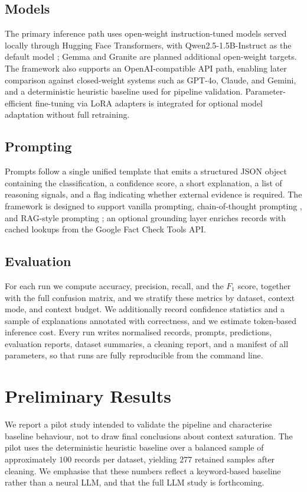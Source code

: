 \documentclass[11pt]{article}
\begin{document}
\subsection{Models}
The primary inference path uses open-weight instruction-tuned models served locally through Hugging Face Transformers, with Qwen2.5-1.5B-Instruct as the default model \citep{qwen2025report}; Gemma and Granite are planned additional open-weight targets. The framework also supports an OpenAI-compatible API path, enabling later comparison against closed-weight systems such as GPT-4o, Claude, and Gemini, and a deterministic heuristic baseline used for pipeline validation. Parameter-efficient fine-tuning via LoRA adapters \citep{hu2022lora} is integrated for optional model adaptation without full retraining.

\subsection{Prompting}
Prompts follow a single unified template that emits a structured JSON object containing the classification, a confidence score, a short explanation, a list of reasoning signals, and a flag indicating whether external evidence is required. The framework is designed to support vanilla prompting, chain-of-thought prompting \citep{wei2022cot}, and RAG-style prompting \citep{lewis2020rag}; an optional grounding layer enriches records with cached lookups from the Google Fact Check Tools API.

\subsection{Evaluation}
For each run we compute accuracy, precision, recall, and the $F_1$ score, together with the full confusion matrix, and we stratify these metrics by dataset, context mode, and context budget. We additionally record confidence statistics and a sample of explanations annotated with correctness, and we estimate token-based inference cost. Every run writes normalised records, prompts, predictions, evaluation reports, dataset summaries, a cleaning report, and a manifest of all parameters, so that runs are fully reproducible from the command line.

\section{Preliminary Results}
\label{sec:results}

We report a pilot study intended to validate the pipeline and characterise baseline behaviour, not to draw final conclusions about context saturation. The pilot uses the deterministic heuristic baseline over a balanced sample of approximately $100$ records per dataset, yielding $277$ retained samples after cleaning. We emphasise that these numbers reflect a keyword-based baseline rather than a neural LLM, and that the full LLM study is forthcoming.
\end{document}
